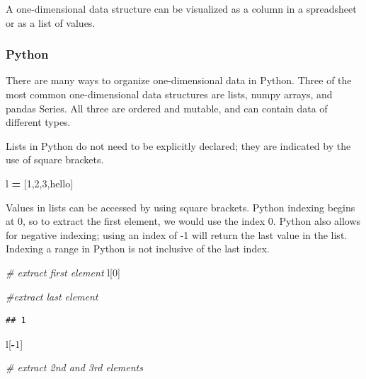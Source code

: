 \documentclass[
]{book}
\newenvironment{Shaded}{\begin{snugshade}}{\end{snugshade}}
\newcommand{\CommentTok}[1]{\textcolor[rgb]{0.56,0.35,0.01}{\textit{#1}}}
\newcommand{\DecValTok}[1]{\textcolor[rgb]{0.00,0.00,0.81}{#1}}
\newcommand{\NormalTok}[1]{#1}
\newcommand{\OperatorTok}[1]{\textcolor[rgb]{0.81,0.36,0.00}{\textbf{#1}}}
\newcommand{\StringTok}[1]{\textcolor[rgb]{0.31,0.60,0.02}{#1}}
\begin{document}
A one-dimensional data structure can be visualized as a column in a spreadsheet or as a list of values.

\hypertarget{python-8}{%
\subsubsection*{Python}\label{python-8}}

There are many ways to organize one-dimensional data in Python. Three of the most common one-dimensional data structures are lists, numpy arrays, and pandas Series. All three are ordered and mutable, and can contain data of different types.

Lists in Python do not need to be explicitly declared; they are indicated by the use of square brackets.

\begin{Shaded}
\begin{Highlighting}[]
\NormalTok{l }\OperatorTok{=}\NormalTok{ [}\DecValTok{1}\NormalTok{,}\DecValTok{2}\NormalTok{,}\DecValTok{3}\NormalTok{,}\StringTok{\textquotesingle{}hello\textquotesingle{}}\NormalTok{]}
\end{Highlighting}
\end{Shaded}

Values in lists can be accessed by using square brackets. Python indexing begins at 0, so to extract the first element, we would use the index 0. Python also allows for negative indexing; using an index of -1 will return the last value in the list. Indexing a range in Python is not inclusive of the last index.

\begin{Shaded}
\begin{Highlighting}[]
\CommentTok{\# extract first element}
\NormalTok{l[}\DecValTok{0}\NormalTok{]}

\CommentTok{\#extract last element}
\end{Highlighting}
\end{Shaded}

\begin{verbatim}
## 1
\end{verbatim}

\begin{Shaded}
\begin{Highlighting}[]
\NormalTok{l[}\OperatorTok{{-}}\DecValTok{1}\NormalTok{]}

\CommentTok{\# extract 2nd and 3rd elements}
\end{Highlighting}
\end{Shaded}
\end{document}

